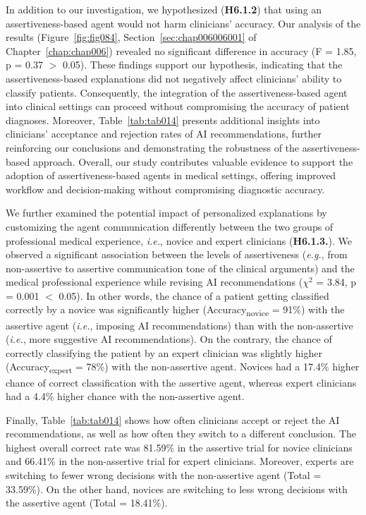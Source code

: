 In addition to our investigation, we hypothesized ({\bf H6.1.2}) that using an assertiveness-based agent would not harm clinicians' accuracy.
Our analysis of the results (Figure~\ref{fig:fig084}, Section~\ref{sec:chap006006001} of Chapter~\ref{chap:chap006}) revealed no significant difference in accuracy (F = 1.85, p = 0.37 $>$ 0.05).
These findings support our hypothesis, indicating that the assertiveness-based explanations did not negatively affect clinicians' ability to classify patients.
Consequently, the integration of the assertiveness-based agent into clinical settings can proceed without compromising the accuracy of patient diagnoses.
Moreover, Table~\ref{tab:tab014} presents additional insights into clinicians' acceptance and rejection rates of \ac{AI} recommendations, further reinforcing our conclusions and demonstrating the robustness of the assertiveness-based approach.
Overall, our study contributes valuable evidence to support the adoption of assertiveness-based agents in medical settings, offering improved workflow and decision-making without compromising diagnostic accuracy.



We further examined the potential impact of personalized explanations by customizing the agent communication differently between the two groups of professional medical experience, {\it i.e.}, novice and expert clinicians ({\bf H6.1.3.}).
We observed a significant association between the levels of assertiveness ({\it e.g.}, from non-assertive to assertive communication tone of the clinical arguments) and the medical professional experience while revising \ac{AI} recommendations ($\chi^2$ = 3.84, p = 0.001 $<$ 0.05).
In other words, the chance of a patient getting classified correctly by a novice was significantly higher (Accuracy\textsubscript{novice} = 91\%) with the assertive agent ({\it i.e.}, imposing \ac{AI} recommendations) than with the non-assertive ({\it i.e.}, more suggestive \ac{AI} recommendations).
On the contrary, the chance of correctly classifying the patient by an expert clinician was slightly higher (Accuracy\textsubscript{expert} = 78\%) with the non-assertive agent.
\textcolor{revised}{Novices had a 17.4\% higher chance of correct classification with the assertive agent, whereas expert clinicians had a 4.4\% higher chance with the non-assertive agent.}

Finally, Table~\ref{tab:tab014} shows how often clinicians accept or reject the \ac{AI} recommendations, as well as how often they switch to a different conclusion.
The highest overall correct rate was 81.59\% in the assertive trial for novice clinicians and 66.41\% in the non-assertive trial for expert clinicians.
Moreover, experts are switching to fewer wrong decisions with the non-assertive agent (Total = 33.59\%).
On the other hand, novices are switching to less wrong decisions with the assertive agent (Total = 18.41\%).

